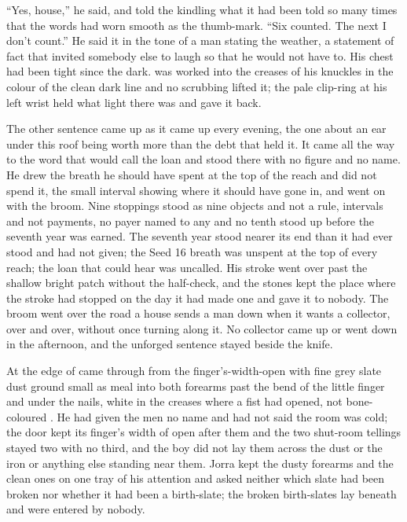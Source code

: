 “Yes, house,” he said, and told the kindling what it had been told so many times that the words had worn smooth as the thumb-mark. “Six counted. The next I don't count.” He said it in the tone of a man stating the weather, a statement of fact that invited somebody else to laugh so that he would not have to. His chest had been tight since the dark.  was worked into the creases of his knuckles in the colour of the clean dark line and no scrubbing lifted it; the pale clip-ring at his left wrist held what light there was and gave it back.

The other sentence came up as it came up every evening, the one about an ear under this roof being worth more than the debt that held it. It came all the way to the word that would call the loan and stood there with no figure and no name. He drew the breath he should have spent at the top of the reach and did not spend it, the small interval showing where it should have gone in, and went on with the broom. Nine stoppings stood as nine objects and not a rule, intervals and not payments, no payer named to any and no tenth stood up before the seventh year was earned. The seventh year stood nearer its end than it had ever stood and had not given; the Seed 16 breath was unspent at the top of every reach; the loan that could hear was uncalled. His stroke went over  past the shallow bright patch without the half-check, and the stones kept the place where the stroke had stopped on the day it had made one and gave it to nobody. The broom went over the road a house sends a man down when it wants a collector, over and over, without once turning along it. No collector came up or went down  in the afternoon, and the unforged sentence stayed beside the knife.

\scenebreak

At the edge of   came through from the finger's-width-open  with fine grey slate dust ground small as meal into both forearms past the bend of the little finger and under the nails, white in the creases where a fist had opened, not bone-coloured . He had given the men no name and had not said the room was cold; the door kept its finger's width of open after them and the two shut-room tellings stayed two with no third, and the boy did not lay them across the dust or the iron or anything else standing near them. Jorra kept the dusty forearms and the clean ones on one tray of his attention and asked neither which slate had been broken nor whether it had been a birth-slate; the broken birth-slates lay beneath  and were entered by nobody.

